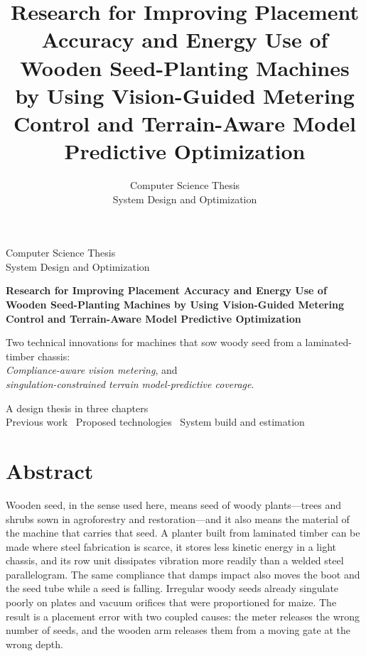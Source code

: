 \documentclass[12pt,a4paper]{report}
\title{Research for Improving Placement Accuracy and Energy Use of Wooden Seed-Planting Machines by Using Vision-Guided Metering Control and Terrain-Aware Model Predictive Optimization}
\author{Computer Science Thesis\\System Design and Optimization}
\date{}
\begin{document}
\begin{titlepage}
\centering
\vspace*{1.6cm}
{\Large Computer Science Thesis}\\[0.4em]
{\large System Design and Optimization}\\[2.2cm]
{\LARGE\bfseries Research for Improving Placement Accuracy and Energy Use of Wooden Seed-Planting Machines by Using Vision-Guided Metering Control and Terrain-Aware Model Predictive Optimization\par}
\vspace{1.6cm}
\begin{minipage}{0.86\textwidth}
\centering
Two technical innovations for machines that sow woody seed from a laminated-timber chassis:\\[0.8em]
\textit{Compliance-aware vision metering}, and\\
\textit{singulation-constrained terrain model-predictive coverage}.
\end{minipage}
\vfill
{\large A design thesis in three chapters}\\[0.6em]
Previous work \textperiodcentered\ Proposed technologies \textperiodcentered\ System build and estimation
\vspace{1.2cm}
\end{titlepage}

\chapter*{Abstract}
Wooden seed, in the sense used here, means seed of woody plants---trees and shrubs sown in agroforestry and restoration---and it also means the material of the machine that carries that seed. A planter built from laminated timber can be made where steel fabrication is scarce, it stores less kinetic energy in a light chassis, and its row unit dissipates vibration more readily than a welded steel parallelogram. The same compliance that damps impact also moves the boot and the seed tube while a seed is falling. Irregular woody seeds already singulate poorly on plates and vacuum orifices that were proportioned for maize. The result is a placement error with two coupled causes: the meter releases the wrong number of seeds, and the wooden arm releases them from a moving gate at the wrong depth.
\end{document}
